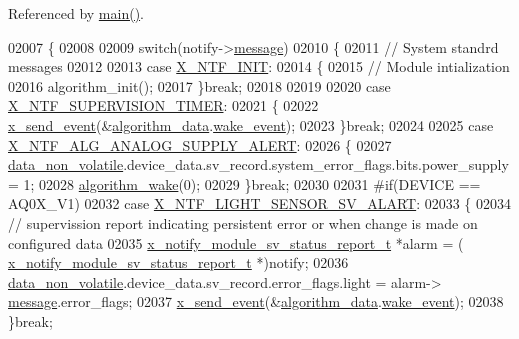 Referenced by \hyperlink{a00048_source_l00080}{main()}.


\begin{DoxyCode}
02007 \{
02008 
02009     \textcolor{keywordflow}{switch}(notify->\hyperlink{a00036_adf9665938515a20c283eea2c978cf80d}{message})
02010     \{
02011         \textcolor{comment}{// System standrd messages }
02012 
02013         \textcolor{keywordflow}{case} \hyperlink{a00036_a620b808f2d7b8d2a03c4d026a4c5423c}{X\_NTF\_INIT}:
02014         \{
02015             \textcolor{comment}{// Module intialization    }
02016             algorithm\_init();            
02017         \}\textcolor{keywordflow}{break};
02018 
02019 
02020         \textcolor{keywordflow}{case} \hyperlink{a00016_aededd1ab0a512a03f6cb0d3459b254e1}{X\_NTF\_SUPERVISION\_TIMER}:
02021         \{
02022            \hyperlink{a00036_a4bc3d03c8d62c8237329ed4e969fbc1b}{x\_send\_event}(&\hyperlink{a00038_a183caa40cd01e79ee309cc9c4a225197}{algorithm\_data}.\hyperlink{a00016_ad6a897cbacf5ae6902272ee198d5cd23}{wake\_event});
02023         \}\textcolor{keywordflow}{break};
02024 
02025         \textcolor{keywordflow}{case}  \hyperlink{a00021_a5c8025c00c22190bf4b4c4fe87123f55}{X\_NTF\_ALG\_ANALOG\_SUPPLY\_ALERT}:            
02026         \{
02027             \hyperlink{a00060_a76ac5f917f5308dcd83de0d7c94559fb}{data\_non\_volatile}.device\_data.sv\_record.system\_error\_flags.bits.power\_supply =
       1;
02028             \hyperlink{a00038_a42ed16c7ef20e0c0031fe7ba7ae377b3}{algorithm\_wake}(0);
02029         \}\textcolor{keywordflow}{break};
02030 
02031 \textcolor{preprocessor}{#if(DEVICE == AQ0X\_V1)}
02032          \textcolor{keywordflow}{case}  \hyperlink{a00021_a472c0187f61238cdef62bf3d965df8e2}{X\_NTF\_LIGHT\_SENSOR\_SV\_ALART}:
02033         \{
02034             \textcolor{comment}{// supervission report indicating persistent error or when change is made on configured data}
02035             \hyperlink{a00021_d7/d1b/a00864}{x\_notify\_module\_sv\_status\_report\_t} *alarm = (
      \hyperlink{a00021_d7/d1b/a00864}{x\_notify\_module\_sv\_status\_report\_t} *)notify;
02036             \hyperlink{a00060_a76ac5f917f5308dcd83de0d7c94559fb}{data\_non\_volatile}.device\_data.sv\_record.error\_flags.light = alarm->
      \hyperlink{a00021_a13393a2d1589483b3bae4d2e79f43980}{message}.error\_flags;
02037              \hyperlink{a00036_a4bc3d03c8d62c8237329ed4e969fbc1b}{x\_send\_event}(&\hyperlink{a00038_a183caa40cd01e79ee309cc9c4a225197}{algorithm\_data}.\hyperlink{a00016_ad6a897cbacf5ae6902272ee198d5cd23}{wake\_event});
02038         \}\textcolor{keywordflow}{break};

\end{DoxyCode}
